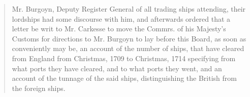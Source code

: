 \begin{quote}
    Mr. Burgoyn, Deputy Register General of all trading ships attending, their lordships had some discourse with him, and afterwards ordered that a letter be writ to Mr. Carkesse to move the Commrs. of his Majesty's Customs for directions to Mr. Burgoyn to lay before this Board, as soon as conveniently may be, an account of the number of ships, that have cleared from England from Christmas, 1709 to Christmas, 1714 specifying from what ports they have cleared, and to what ports they went, and an account of the tunnage of the said ships, distinguishing the British from the foreign ships.
\end{quote}